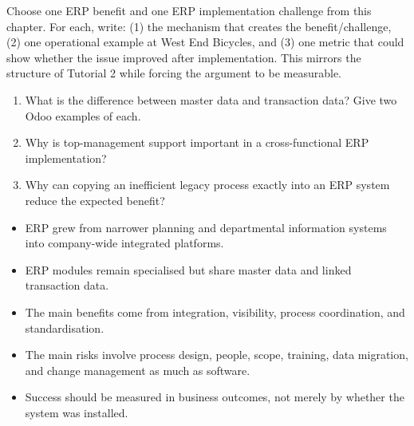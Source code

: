 \begin{tryit}
Choose one ERP benefit and one ERP implementation challenge from this chapter. For each, write: (1) the mechanism that creates the benefit/challenge, (2) one operational example at West End Bicycles, and (3) one metric that could show whether the issue improved after implementation. This mirrors the structure of Tutorial 2 while forcing the argument to be measurable.
\end{tryit}

\begin{quickcheck}
\begin{enumerate}
  \item What is the difference between master data and transaction data? Give two Odoo examples of each.
  \item Why is top-management support important in a cross-functional ERP implementation?
  \item Why can copying an inefficient legacy process exactly into an ERP system reduce the expected benefit?
\end{enumerate}
\end{quickcheck}

\begin{chapterrecap}
\begin{itemize}
  \item ERP grew from narrower planning and departmental information systems into company-wide integrated platforms.
  \item ERP modules remain specialised but share master data and linked transaction data.
  \item The main benefits come from integration, visibility, process coordination, and standardisation.
  \item The main risks involve process design, people, scope, training, data migration, and change management as much as software.
  \item Success should be measured in business outcomes, not merely by whether the system was installed.
\end{itemize}
\end{chapterrecap}
